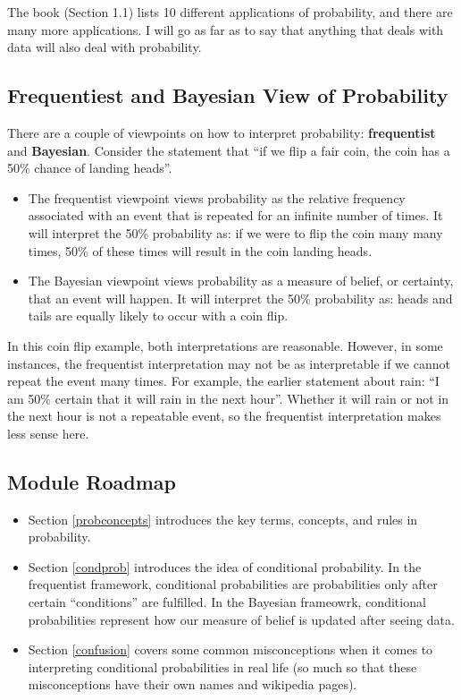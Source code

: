 \documentclass[
]{book}
\providecommand{\tightlist}{%
  \setlength{\itemsep}{0pt}\setlength{\parskip}{0pt}}
\begin{document}
The book (Section 1.1) lists 10 different applications of probability, and there are many more applications. I will go as far as to say that anything that deals with data will also deal with probability.

\hypertarget{frequentiest-and-bayesian-view-of-probability}{%
\subsection{Frequentiest and Bayesian View of Probability}\label{frequentiest-and-bayesian-view-of-probability}}

There are a couple of viewpoints on how to interpret probability: \textbf{frequentist} and \textbf{Bayesian}. Consider the statement that ``if we flip a fair coin, the coin has a 50\% chance of landing heads''.

\begin{itemize}
\item
  The frequentist viewpoint views probability as the relative frequency associated with an event that is repeated for an infinite number of times. It will interpret the 50\% probability as: if we were to flip the coin many many times, 50\% of these times will result in the coin landing heads.
\item
  The Bayesian viewpoint views probability as a measure of belief, or certainty, that an event will happen. It will interpret the 50\% probability as: heads and tails are equally likely to occur with a coin flip.
\end{itemize}

In this coin flip example, both interpretations are reasonable. However, in some instances, the frequentist interpretation may not be as interpretable if we cannot repeat the event many times. For example, the earlier statement about rain: ``I am 50\% certain that it will rain in the next hour''. Whether it will rain or not in the next hour is not a repeatable event, so the frequentist interpretation makes less sense here.

\hypertarget{module-roadmap}{%
\subsection{Module Roadmap}\label{module-roadmap}}

\begin{itemize}
\tightlist
\item
  Section \ref{probconcepts} introduces the key terms, concepts, and rules in probability.
\item
  Section \ref{condprob} introduces the idea of conditional probability. In the frequentist framework, conditional probabilities are probabilities only after certain ``conditions'' are fulfilled. In the Bayesian frameowrk, conditional probabilities represent how our measure of belief is updated after seeing data.
\item
  Section \ref{confusion} covers some common misconceptions when it comes to interpreting conditional probabilities in real life (so much so that these misconceptions have their own names and wikipedia pages).
\end{itemize}
\end{document}
